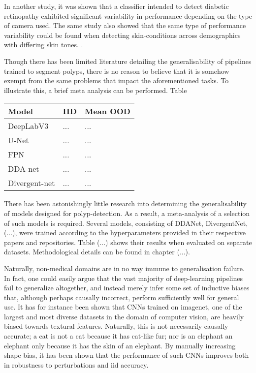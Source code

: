 	In another study, it was shown that a classifier intended to detect diabetic retinopathy exhibited significant variability in performance depending on the type of camera used. The same study also showed that the same type of performance variability could be found when detecting skin-conditions across demographics with differing skin tones. \cite{damour2020underspecification}. 
	
	Though there has been limited literature detailing the generalisability of pipelines trained to segment polyps, there is no reason to believe that it is somehow exempt from the same problems that impact the aforementioned tasks. To illustrate this, a brief meta analysis can be performed. Table
	\begin{table}
		\centering
		\begin{tabularx}{\textwidth}{X | X X}
			Model & IID & Mean OOD \\
			\hline
			DeepLabV3 & ... & ... \\
			U-Net & ... & ... \\
			FPN & ... & ... \\
			DDA-net & ... & ... \\
			Divergent-net & ... & ...\\
		\end{tabularx}
				\label{table:polyp-case}
	\end{table}
	There has been astonishingly little research into determining the generalisability of models designed for polyp-detection. As a result, a meta-analysis of a selection of such models is required. Several models, consisting of DDANet, DivergentNet, (...), were trained according to the hyperparameters provided in their respective papers and repositories. Table (...) shows their results when evaluated on separate datasets. Methodological details can be found in chapter (...). 

	Naturally, non-medical domains are in no way immune to generalisation failure. In fact, one could easily argue that the vast majority of deep-learning pipelines fail to generalize altogether, and instead merely infer some set of inductive biases that, although perhaps causally incorrect, perform sufficiently well for general use. It has for instance been shown that CNNs trained on imagenet, one of the largest and most diverse datasets in the domain of computer vision, are heavily biased towards textural features\cite{texturebias}. Naturally, this is not necessarily causally accurate; a cat is not a cat because it has cat-like fur; nor is an elephant an elephant only because it has the skin of an elephant. By manually increasing shape bias, it has been shown that the performance of such CNNs improves both in robustness to perturbations and iid accuracy.
	
